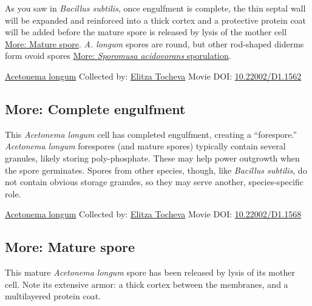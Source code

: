 \documentclass[]{tufte-book}
\begin{document}
As you saw in \emph{Bacillus subtilis}, once engulfment is complete, the thin septal wall will be expanded and reinforced into a thick cortex and a protective protein coat will be added before the mature spore is released by lysis of the mother cell \protect\hyperlink{Mature_spore}{More: Mature spore}. \emph{A. longum} spores are round, but other rod-shaped diderms form ovoid spores \protect\hyperlink{ux2aSporomusa_acidovoransux2a_sporulation}{More: \emph{Sporomusa acidovorans} sporulation}.



\hypertarget{htmlwidget-98e0fe5f1fad388a683a}{}

\label{fig:8-10}\protect\hyperlink{tree}{Acetonema longum} Collected by: \protect\hyperlink{elitza_tocheva}{Elitza Tocheva} Movie DOI: \href{https://doi.org/10.22002/D1.1562}{10.22002/D1.1562}

\hypertarget{Complete_engulfment}{%
\subsection*{More: Complete engulfment}\label{Complete_engulfment}}

This \emph{Acetonema longum} cell has completed engulfment, creating a ``forespore.'' \emph{Acetonema longum} forespores (and mature spores) typically contain several granules, likely storing poly-phosphate. These may help power outgrowth when the spore germinates. Spores from other species, though, like \emph{Bacillus subtilis}, do not contain obvious storage granules, so they may serve another, species-specific role.



\hypertarget{htmlwidget-d0c2e46c62ac336dac30}{}

\label{fig:8-10a}\protect\hyperlink{tree}{Acetonema longum} Collected by: \protect\hyperlink{elitza_tocheva}{Elitza Tocheva} Movie DOI: \href{https://doi.org/10.22002/D1.1568}{10.22002/D1.1568}

\hypertarget{Mature_spore}{%
\subsection*{More: Mature spore}\label{Mature_spore}}

This mature \emph{Acetonema longum} spore has been released by lysis of its mother cell. Note its extensive armor: a thick cortex between the membranes, and a multilayered protein coat.
\end{document}
